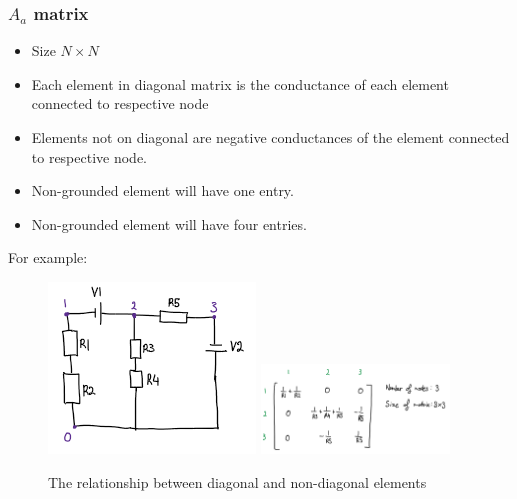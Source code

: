 \documentclass[a4paper, titlepage]{article}
\begin{document}
    \subsubsection{$A_a$ matrix}
    \begin{itemize}
        \item Size $N\times N$
        \item Each element in diagonal matrix is the conductance of each element connected to respective node
        \item Elements not on diagonal are negative conductances of the element connected to respective node.
        \item Non-grounded element will have one entry.
        \item Non-grounded element will have four entries.
    \end{itemize}
    For example:
    \begin{figure}[htp]
        \centering
        \includegraphics[width=.2\textwidth,scale=1]{Circuit2}
        \includegraphics[width=50mm,scale=1]{Matrix2}
        \caption{The relationship between diagonal and non-diagonal elements}
        \label{fig:figure3}
    \end{figure}
    \pagebreak
\end{document}
